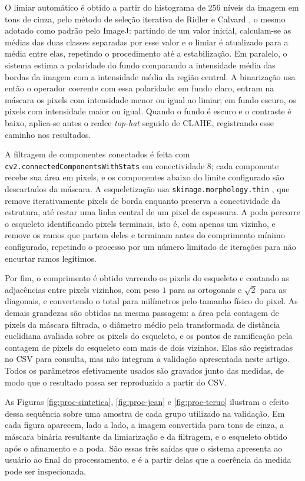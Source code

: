 \documentclass[12pt]{article}
\begin{document}
O limiar automático é obtido a partir do histograma de 256 níveis da imagem em tons de cinza, pelo método de seleção iterativa de Ridler e Calvard \cite{ridler1978picture}, o mesmo adotado como padrão pelo ImageJ: partindo de um valor inicial, calculam-se as médias das duas classes separadas por esse valor e o limiar é atualizado para a média entre elas, repetindo o procedimento até a estabilização. Em paralelo, o sistema estima a polaridade do fundo comparando a intensidade média das bordas da imagem com a intensidade média da região central. A binarização usa então o operador coerente com essa polaridade: em fundo claro, entram na máscara os pixels com intensidade menor ou igual ao limiar; em fundo escuro, os pixels com intensidade maior ou igual. Quando o fundo é escuro e o contraste é baixo, aplica-se antes o realce \textit{top-hat} seguido de CLAHE, registrando esse caminho nos resultados.

A filtragem de componentes conectados é feita com \texttt{cv2.connectedComponentsWithStats} em conectividade 8; cada componente recebe sua área em pixels, e os componentes abaixo do limite configurado são descartados da máscara. A esqueletização usa \texttt{skimage.morphology.thin} \cite{vanderwalt2014skimage}, que remove iterativamente pixels de borda enquanto preserva a conectividade da estrutura, até restar uma linha central de um pixel de espessura. A poda percorre o esqueleto identificando pixels terminais, isto é, com apenas um vizinho, e remove os ramos que partem deles e terminam antes do comprimento mínimo configurado, repetindo o processo por um número limitado de iterações para não encurtar ramos legítimos.

Por fim, o comprimento é obtido varrendo os pixels do esqueleto e contando as adjacências entre pixels vizinhos, com peso $1$ para as ortogonais e $\sqrt{2}$ para as diagonais, e convertendo o total para milímetros pelo tamanho físico do pixel. As demais grandezas são obtidas na mesma passagem: a área pela contagem de pixels da máscara filtrada, o diâmetro médio pela transformada de distância euclidiana \cite{felzenszwalb2012distance,virtanen2020scipy} avaliada sobre os pixels do esqueleto, e os pontos de ramificação pela contagem de pixels do esqueleto com mais de dois vizinhos. Elas são registradas no CSV para consulta, mas não integram a validação apresentada neste artigo. Todos os parâmetros efetivamente usados são gravados junto das medidas, de modo que o resultado possa ser reproduzido a partir do CSV.


As Figuras \ref{fig:proc-sintetica}, \ref{fig:proc-jean} e \ref{fig:proc-teruo} ilustram o efeito dessa sequência sobre uma amostra de cada grupo utilizado na validação. Em cada figura aparecem, lado a lado, a imagem convertida para tons de cinza, a máscara binária resultante da limiarização e da filtragem, e o esqueleto obtido após o afinamento e a poda. São essas três saídas que o sistema apresenta ao usuário ao final do processamento, e é a partir delas que a coerência da medida pode ser inspecionada.
\end{document}
